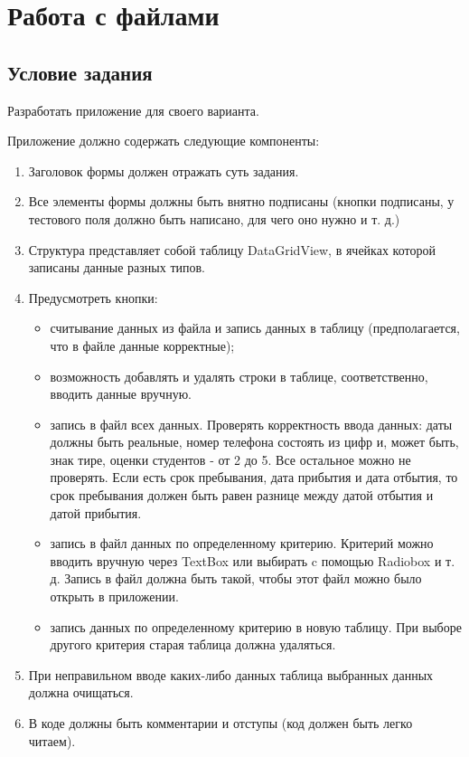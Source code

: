 \section{Работа с файлами}

\subsection{Условие задания}

Разработать приложение для своего варианта. 

Приложение должно содержать следующие компоненты:

\begin{enumerate}
    \item Заголовок формы должен отражать суть задания.
    \item Все элементы формы должны быть внятно подписаны (кнопки подписаны, у тестового поля должно быть написано, для чего оно нужно и т. д.)
    \item Структура представляет собой таблицу DataGridView, в ячейках которой записаны данные разных типов. 
    \item Предусмотреть кнопки: 
    \begin{itemize}
        \item считывание данных из файла и запись данных в таблицу (предполагается, что в файле данные корректные); 
        \item возможность добавлять и удалять строки в таблице, соответственно, вводить данные вручную.
        \item  запись в файл всех данных. Проверять корректность ввода данных: даты должны быть реальные, номер телефона состоять из цифр и, может быть, знак тире, оценки студентов - от 2 до 5. Все остальное можно не проверять. Если есть срок пребывания, дата прибытия и дата отбытия, то срок пребывания должен быть равен разнице между датой отбытия и датой прибытия.
        \item запись в файл данных по определенному критерию. Критерий можно вводить вручную через TextBox или выбирать c помощью Radiobox и т. д. Запись в файл должна быть такой, чтобы этот файл можно было открыть в приложении.
        \item запись данных по определенному критерию в новую таблицу. При выборе другого критерия старая таблица должна удаляться.
    \end{itemize}
    \item При неправильном вводе каких-либо данных таблица выбранных данных должна очищаться. 
    \item В коде должны быть комментарии и отступы (код должен быть легко читаем).
\end{enumerate}

